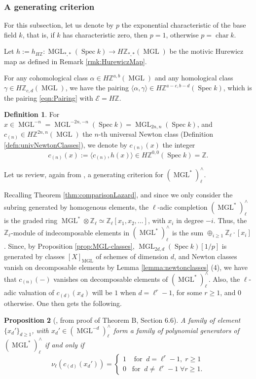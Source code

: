 \documentclass[10pt]{amsart}
\theoremstyle{definition}
\newtheorem{defn}{Definition}[section]
\theoremstyle{plain}
\newtheorem{prop}[defn]{Proposition}
\numberwithin{equation}{section}
\newcommand{\0}{\emptyset}
\newcommand{\sE}{{\mathcal E}}
\newcommand{\Z}{{\mathbb Z}}
\newcommand{\MGL}{{\operatorname{MGL}}}
\newcommand{\Spec}{{\operatorname{Spec}}}
\newcommand{\chr}{{\operatorname{char}}}
\begin{document}
\subsubsection{A generating criterion}

For this subsection, let us denote by $p$ the exponential characteristic of the base field $k$, that is, if $k$ has characteristic zero, then $p=1$, otherwise $p=\chr k$.

Let $h:= h_{H\Z}:\MGL_{*,*}(\Spec k) \to H\Z_{*,*}(\MGL)$ be the motivic Hurewicz map as defined in Remark \ref{rmk:HurewiczMap}.

For any cohomological class $\alpha \in H\mathbb{Z}^{a,b}(\MGL)$ and any homological class $\gamma \in H\mathbb{Z}_{c,d}(\MGL)$, we have the pairing $\langle \alpha,\gamma \rangle \in H\mathbb{Z}^{a-c,b-d}(\Spec k)$, which is the pairing \eqref{eqn:Pairing} with $\sE=H\Z$.

\begin{defn}
    For $x \in \MGL^{-n}=\MGL^{-2n,-n}(\Spec k)=\MGL_{2n,n}(\Spec k)$, and $c_{(n)} \in H\Z^{2n,n}(\MGL)$ the $n$-th universal Newton class (Definition \ref{defn:univNewtonClasses}), we denote by $c_{(n)}(x)$ the integer
$$c_{(n)}(x) := \langle c_{(n)},h(x) \rangle \in H\Z^{0,0}(\Spec k)=\Z.$$
\end{defn}

Let us review, again from \cite[Section 6.6]{lev:ellcoh}, a generating criterion for $(\MGL^*)^\wedge_\ell$.

Recalling Theorem \ref{thm:comparisonLazard}, and since we only consider the subring generated by homogenous elements, the $\ell$-adic completion $(\MGL^*)^\wedge_\ell$ is the graded ring $\MGL^* \otimes \Z_\ell \simeq \Z_\ell[x_1, x_2, \ldots]$, with $x_i$ in degree $-i$. Thus, the $\Z_\ell$-module of indecomposable elements in $(\MGL^*)^\wedge_\ell$ is the sum $\oplus_{i\ge 1}\Z_\ell \cdot [x_i]$. Since, by Proposition \ref{prop:MGL-classes}, $\MGL_{2d,d}(\Spec k)[1/p]$ is generated by classes $[X]_{\MGL}$ of schemes of dimension $d$, and Newton classes vanish on decomposable elements by Lemma \ref{lemma:newtonclasses} (4), we have that $c_{(n)}(-)$ vanishes on decomposable elements of $(\MGL^*)^\wedge_\ell$. Also, the $\ell$-adic valuation of $c_{(d)}(x_d)$ will be $1$ when $d=\ell^r-1$, for some $r \ge 1$, and 0 otherwise. One then gets the following.

\begin{prop}[\cite{lev:ellcoh}, from proof of Theorem B, Section 6.6]
\label{prop:CriterionMGL}
    A family of element $\{x_d'\}_{d \ge 1}$, with $x_d' \in (\MGL^{-d})^\wedge_\ell$ form a family of polynomial generators of $(\MGL^*)^\wedge_\ell$ if and only if
    \begin{equation*}
        \nu_\ell(c_{(d)}(x_d'))=
        \begin{cases}
            1 \; \; \; \; \text{for} \; \; d= \ell^r-1, \; r\ge 1 \\
            0 \; \; \; \text{for} \; \; d \neq \ell^r-1 \; \forall r \ge 1.
        \end{cases}
    \end{equation*}
\end{prop}
\end{document}
